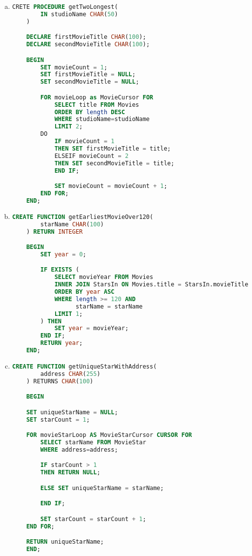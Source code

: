 \documentclass[12pt]{article}
\begin{document}
\begin{enumerate}[1.]
\begin{enumerate}[a)]
        \item

    \begin{lstlisting}[language=SQL]
    CRETE PROCEDURE getTwoLongest(
        IN studioName CHAR(50)
    )

    DECLARE firstMovieTitle CHAR(100);
    DECLARE secondMovieTitle CHAR(100);

    BEGIN
        SET movieCount = 1;
        SET firstMovieTitle = NULL;
        SET secondMovieTitle = NULL;

        FOR movieLoop as MovieCursor FOR
            SELECT title FROM Movies
            ORDER BY length DESC
            WHERE studioName=studioName
            LIMIT 2;
        DO
            IF movieCount = 1
            THEN SET firstMovieTitle = title;
            ELSEIF movieCount = 2
            THEN SET secondMovieTitle = title;
            END IF;

            SET movieCount = movieCount + 1;
        END FOR;
    END;
    \end{lstlisting}

        \item

    \begin{lstlisting}[language=SQL]
    CREATE FUNCTION getEarliestMovieOver120(
        starName CHAR(100)
    ) RETURN INTEGER

    BEGIN
        SET year = 0;

        IF EXISTS (
            SELECT movieYear FROM Movies
            INNER JOIN StarsIn ON Movies.title = StarsIn.movieTitle
            ORDER BY year ASC
            WHERE length >= 120 AND
                  starName = starName
            LIMIT 1;
        ) THEN
            SET year = movieYear;
        END IF;
        RETURN year;
    END;

    \end{lstlisting}

    \item

    \begin{lstlisting}[language=SQL]
    CREATE FUNCTION getUniqueStarWithAddress(
        address CHAR(255)
    ) RETURNS CHAR(100)

    BEGIN

    SET uniqueStarName = NULL;
    SET starCount = 1;

    FOR movieStarLoop AS MovieStarCursor CURSOR FOR
        SELECT starName FROM MovieStar
        WHERE address=address;

        IF starCount > 1
        THEN RETURN NULL;

        ELSE SET uniqueStarName = starName;

        END IF;

        SET starCount = starCount + 1;
    END FOR;

    RETURN uniqueStarName;
    END;

    \end{lstlisting}
    \end{enumerate}
\end{enumerate}
\end{document}
